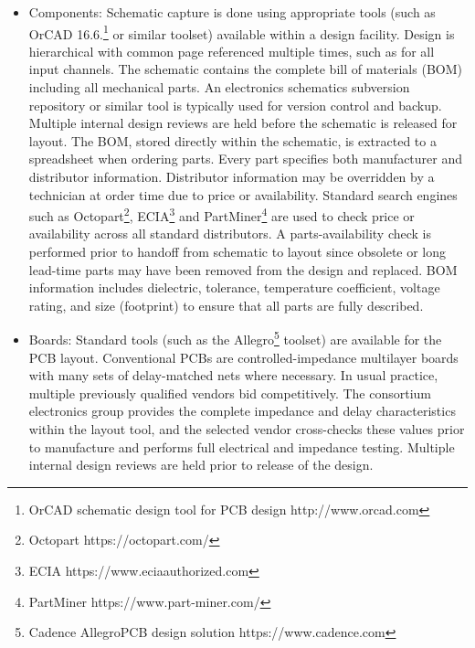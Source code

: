 \begin{itemize}

\item Components: Schematic capture is done using appropriate tools (such as OrCAD 16.6.\footnote{OrCAD\texttrademark{} schematic design tool for PCB design http://www.orcad.com} or similar toolset) available within a design facility. Design is hierarchical with common  page referenced multiple times, such as for all input channels. 
The schematic contains the complete bill of materials (BOM) including all mechanical parts. An electronics schematics subversion
repository or similar tool is typically used for version control and backup. Multiple internal design reviews are held before the schematic is released %
for layout. The BOM, stored directly within the schematic, is extracted to a spreadsheet when ordering parts. Every part specifies %
both manufacturer and distributor information. Distributor information may be overridden by a technician at order time due to price or availability. Standard search engines such as Octopart\footnote{Octopart https://octopart.com/}, ECIA\footnote{ ECIA https://www.eciaauthorized.com} and PartMiner\footnote{PartMiner https://www.part-miner.com/} are used to check price or availability across all standard distributors. A parts-availability check %
is performed prior to handoff from schematic to layout since %
obsolete or long lead-time parts %
may have been removed from the design and replaced. BOM information includes dielectric, tolerance, temperature coefficient, voltage rating, and size (footprint) to ensure that all parts are fully described.

\item Boards: Standard tools (such as the Allegro\footnote{Cadence Allegro\textregistered PCB design solution https://www.cadence.com} toolset) are available for the PCB layout. Conventional PCBs are %
controlled-impedance multilayer boards with many sets of delay-matched nets where necessary. %
In usual practice, multiple previously qualified vendors bid competitively. The consortium electronics group provides the complete impedance and delay characteristics  within the layout tool, and the selected vendor cross-checks these values prior to manufacture and performs full electrical and impedance testing.  Multiple internal design reviews are held prior to release of the design.


\end{itemize}
